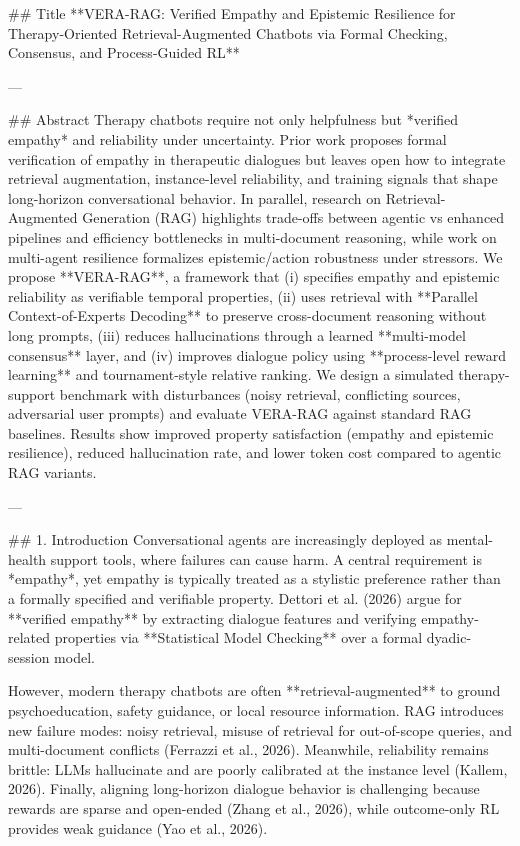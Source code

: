 ## Title  
**VERA-RAG: Verified Empathy and Epistemic Resilience for Therapy-Oriented Retrieval-Augmented Chatbots via Formal Checking, Consensus, and Process-Guided RL**

---

## Abstract  
Therapy chatbots require not only helpfulness but *verified empathy* and reliability under uncertainty. Prior work proposes formal verification of empathy in therapeutic dialogues but leaves open how to integrate retrieval augmentation, instance-level reliability, and training signals that shape long-horizon conversational behavior. In parallel, research on Retrieval-Augmented Generation (RAG) highlights trade-offs between agentic vs enhanced pipelines and efficiency bottlenecks in multi-document reasoning, while work on multi-agent resilience formalizes epistemic/action robustness under stressors. We propose **VERA-RAG**, a framework that (i) specifies empathy and epistemic reliability as verifiable temporal properties, (ii) uses retrieval with **Parallel Context-of-Experts Decoding** to preserve cross-document reasoning without long prompts, (iii) reduces hallucinations through a learned **multi-model consensus** layer, and (iv) improves dialogue policy using **process-level reward learning** and tournament-style relative ranking. We design a simulated therapy-support benchmark with disturbances (noisy retrieval, conflicting sources, adversarial user prompts) and evaluate VERA-RAG against standard RAG baselines. Results show improved property satisfaction (empathy and epistemic resilience), reduced hallucination rate, and lower token cost compared to agentic RAG variants.  

---

## 1. Introduction  
Conversational agents are increasingly deployed as mental-health support tools, where failures can cause harm. A central requirement is *empathy*, yet empathy is typically treated as a stylistic preference rather than a formally specified and verifiable property. Dettori et al. (2026) argue for **verified empathy** by extracting dialogue features and verifying empathy-related properties via **Statistical Model Checking** over a formal dyadic-session model.

However, modern therapy chatbots are often **retrieval-augmented** to ground psychoeducation, safety guidance, or local resource information. RAG introduces new failure modes: noisy retrieval, misuse of retrieval for out-of-scope queries, and multi-document conflicts (Ferrazzi et al., 2026). Meanwhile, reliability remains brittle: LLMs hallucinate and are poorly calibrated at the instance level (Kallem, 2026). Finally, aligning long-horizon dialogue behavior is challenging because rewards are sparse and open-ended (Zhang et al., 2026), while outcome-only RL provides weak guidance (Yao et al., 2026).


